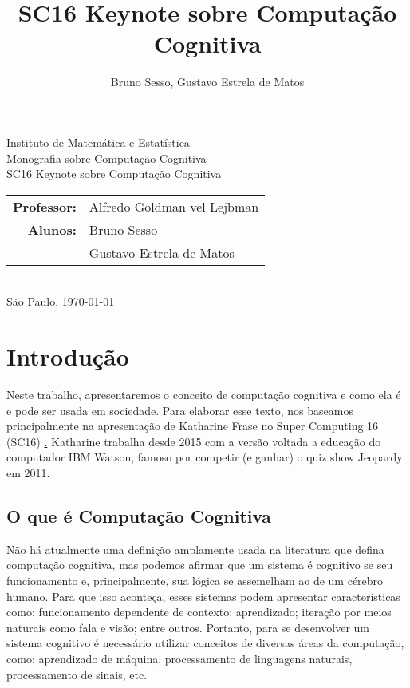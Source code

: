 \documentclass[12pt]{article}
\title{SC16 Keynote sobre Computação Cognitiva}
\author{Bruno Sesso, Gustavo Estrela de Matos}
\begin{document}
\doublespacing
\begin{titlepage}
    \vfill
    \begin{center}
        \vspace{0.5\textheight}
        \noindent
        Instituto de Matemática e Estatística \\
        Monografia sobre Computação Cognitiva \\
        \vfill
        \noindent
        {\Large SC16 Keynote sobre Computação Cognitiva} \\
        \begin{tabular}{rl}
            {\bf Professor:} & {Alfredo Goldman vel Lejbman} \\
            {\bf Alunos:}    & {Bruno Sesso} \\
                             & {Gustavo Estrela de Matos} \\
        \end{tabular} \\
        \vspace{\fill}
       \bigskip
        São Paulo, \today \\
       \bigskip
    \end{center}
\end{titlepage}

\pagebreak
\tableofcontents
\pagebreak

\section{Introdução}
Neste trabalho, apresentaremos o conceito de computação cognitiva e como
ela é e pode ser usada em sociedade. Para elaborar esse texto, nos 
baseamos principalmente na apresentação de Katharine Frase no Super
Computing 16 (SC16) \href{katherine_frase_keynote}. Katharine trabalha
desde 2015 com a versão voltada a educação do computador IBM Watson, 
famoso por competir (e ganhar) o quiz show Jeopardy em 2011.

\subsection{O que é Computação Cognitiva}
Não há atualmente uma definição amplamente usada na literatura que 
defina computação cognitiva, mas podemos afirmar que um sistema 
é cognitivo se seu funcionamento e, principalmente, sua lógica se
assemelham ao de um cérebro humano. Para que isso aconteça, esses
sistemas podem apresentar características como: funcionamento dependente
de contexto; aprendizado; iteração por meios naturais como fala e visão;
entre outros. Portanto, para se desenvolver um sistema cognitivo é
necessário utilizar conceitos de diversas áreas da computação, como:
aprendizado de máquina, processamento de linguagens naturais,
processamento de sinais, etc.
\end{document}
